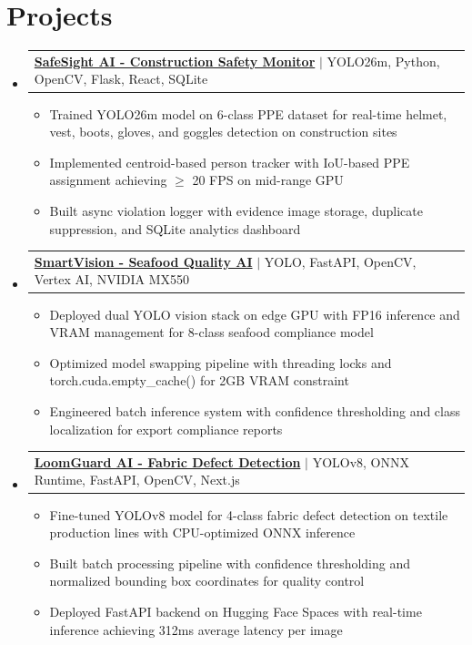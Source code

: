 \documentclass[letterpaper,11pt]{article}
\makeatletter
\newcommand{\resumeItem}[1]{
  \item\small{
    {#1 \vspace{-2pt}}
  }
}
\newcommand{\resumeProjectHeading}[2]{
    \item
    \begin{tabular*}{1.001\textwidth}{l@{\extracolsep{\fill}}r}
      \small#1 & \textbf{\small #2}\\
    \end{tabular*}\vspace{-7pt}
}
\newcommand{\resumeSubHeadingListStart}{\begin{itemize}[leftmargin=0.0in, label={}]}
\newcommand{\resumeSubHeadingListEnd}{\end{itemize}}
\newcommand{\resumeItemListStart}{\begin{itemize}}
\newcommand{\resumeItemListEnd}{\end{itemize}\vspace{-5pt}}
\makeatother
\begin{document}
\section{Projects}
  \resumeSubHeadingListStart
    \resumeProjectHeading
      {\textbf{\href{https://github.com/hiru-viru/safesight-ai}{SafeSight AI - Construction Safety Monitor}} $|$ YOLO26m, Python, OpenCV, Flask, React, SQLite}{}
      \resumeItemListStart
        \resumeItem{Trained YOLO26m model on 6-class PPE dataset for real-time helmet, vest, boots, gloves, and goggles detection on construction sites}
        \resumeItem{Implemented centroid-based person tracker with IoU-based PPE assignment achieving $\geq$ 20 FPS on mid-range GPU}
        \resumeItem{Built async violation logger with evidence image storage, duplicate suppression, and SQLite analytics dashboard}
      \resumeItemListEnd
    \vspace{-13pt}

    \resumeProjectHeading
      {\textbf{\href{https://github.com/hiru-viru/smartvision}{SmartVision - Seafood Quality AI}} $|$ YOLO, FastAPI, OpenCV, Vertex AI, NVIDIA MX550}{}
      \resumeItemListStart
        \resumeItem{Deployed dual YOLO vision stack on edge GPU with FP16 inference and VRAM management for 8-class seafood compliance model}
        \resumeItem{Optimized model swapping pipeline with threading locks and torch.cuda.empty\_cache() for 2GB VRAM constraint}
        \resumeItem{Engineered batch inference system with confidence thresholding and class localization for export compliance reports}
      \resumeItemListEnd
    \vspace{-13pt}

     \resumeProjectHeading
      {\textbf{\href{https://github.com/Git-by-Devi/LoomGuard-AI}{LoomGuard AI - Fabric Defect Detection}} $|$ YOLOv8, ONNX Runtime, FastAPI, OpenCV, Next.js}{}
      \resumeItemListStart
        \resumeItem{Fine-tuned YOLOv8 model for 4-class fabric defect detection on textile production lines with CPU-optimized ONNX inference}
        \resumeItem{Built batch processing pipeline with confidence thresholding and normalized bounding box coordinates for quality control}
        \resumeItem{Deployed FastAPI backend on Hugging Face Spaces with real-time inference achieving 312ms average latency per image}
      \resumeItemListEnd
    \vspace{-9pt}
  \resumeSubHeadingListEnd
\end{document}
